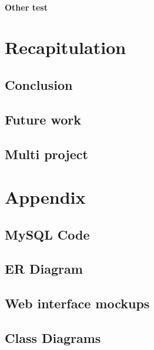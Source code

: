       \subsubsection{Other test}

\chapter{Recapitulation}
  \section{Conclusion}
  \section{Future work}
  \section{Multi project} %

\appendix
	\chapter{Appendix}
	\section{MySQL Code}
	\label{MySQLcode}
		
	\section{ER Diagram}
	\label{errDiagram}
		
	\section{Web interface mockups}
		
		\label{app:Mock}
	\section{Class Diagrams}
	\label{app:Class-diagrams}
		
        



\appendix


